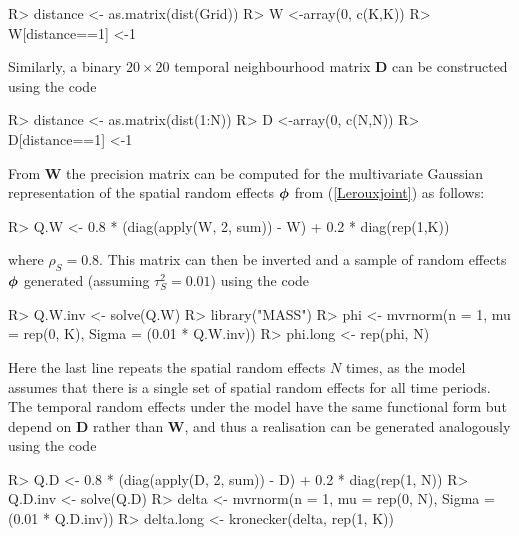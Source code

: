 \documentclass[article, nojss]{jss}
\newcommand{\bd}[1]{\ensuremath{\mbox{\boldmath $#1$}}}
\begin{document}
\begin{CodeInput}
R> distance <- as.matrix(dist(Grid))
R> W <-array(0, c(K,K))
R> W[distance==1] <-1
\end{CodeInput}

Similarly, a binary $20\times 20$ temporal neighbourhood matrix $\mathbf{D}$ can be constructed using the code

\begin{Schunk}
\begin{Sinput}
R> distance <- as.matrix(dist(1:N))
R> D <-array(0, c(N,N))
R> D[distance==1] <-1
\end{Sinput}
\end{Schunk}

From $\mathbf{W}$ the precision matrix can be computed for the multivariate Gaussian representation of the spatial random effects $\bd{\phi}$ from  (\ref{Lerouxjoint}) as follows:

\begin{Schunk}
\begin{Sinput}
R> Q.W <- 0.8 * (diag(apply(W, 2, sum)) - W) + 0.2 * diag(rep(1,K))
\end{Sinput}
\end{Schunk}

where $\rho_S=0.8$. This matrix can then be inverted and a sample of random effects $\bd{\phi}$ generated (assuming $\tau^2_S=0.01$) using the code

\begin{Schunk}
\begin{Sinput}
R> Q.W.inv <- solve(Q.W)
R> library("MASS")
R> phi <- mvrnorm(n = 1, mu = rep(0, K), Sigma = (0.01 * Q.W.inv))
R> phi.long <- rep(phi, N)
\end{Sinput}
\end{Schunk}

Here the last line repeats the spatial random effects $N$ times, as the  model assumes that there is a single set of spatial random effects for all time periods. The temporal random effects under the  model have the same functional form but depend on $\mathbf{D}$ rather than $\mathbf{W}$, and thus a realisation can be generated analogously using the code


\begin{Schunk}
\begin{Sinput}
R> Q.D <- 0.8 * (diag(apply(D, 2, sum)) - D) + 0.2 * diag(rep(1, N))
R> Q.D.inv <- solve(Q.D)
R> delta <- mvrnorm(n = 1, mu = rep(0, N), Sigma = (0.01 * Q.D.inv))
R> delta.long <- kronecker(delta, rep(1, K))
\end{Sinput}
\end{Schunk}
\end{document}
